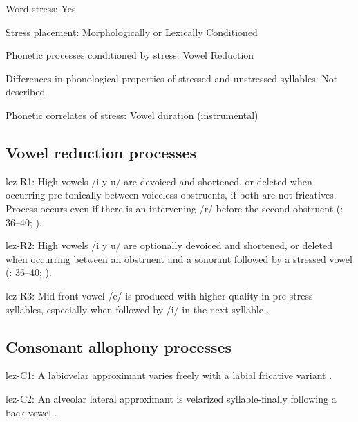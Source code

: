 {\begin{appendixdesc}
\item[Word stress:] Yes

\item[Stress placement:] Morphologically or Lexically Conditioned

\item[Phonetic processes conditioned by stress:] Vowel Reduction

\item[Differences in phonological properties of stressed and unstressed syllables:] Not described

\item[Phonetic correlates of stress:] Vowel duration (instrumental)
\end{appendixdesc}
\subsection*{Vowel reduction processes}
\begin{appendixdesc}

\item[lez-R1:] High vowels /i y u/ are devoiced and shortened, or deleted when occurring pre-tonically between voiceless obstruents, if both are not fricatives. Process occurs even if there is an intervening /r/ before the second obstruent (\citealt{Haspelmath1993}: 36--40; \citealt{ChitoranBabaliyeva2007}).

\item[lez-R2:] High vowels /i y u/ are optionally devoiced and shortened, or deleted when occurring between an obstruent and a sonorant followed by a stressed vowel (\citealt{Haspelmath1993}: 36--40; \citealt{ChitoranBabaliyeva2007}).

\item[lez-R3:] Mid front vowel /e/ is produced with higher quality in pre-stress syllables, especially when followed by /i/ in the next syllable \citep[32]{Haspelmath1993}.
\end{appendixdesc}
\subsection*{Consonant allophony processes}
\begin{appendixdesc}

\item[lez-C1:] A labiovelar approximant varies freely with a labial fricative variant \citep[35]{Haspelmath1993}.

\item[lez-C2:] An alveolar lateral approximant is velarized syllable-finally following a back vowel \citep[35]{Haspelmath1993}.
\end{appendixdesc}
}
